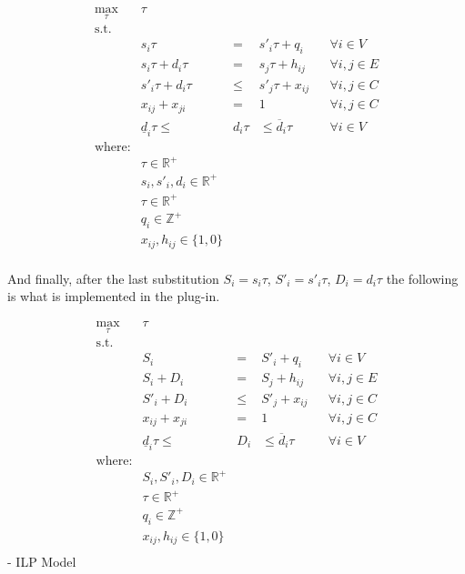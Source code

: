 \begin{equation}
\begin{matrix}
\displaystyle \max_\tau & \tau  \\
\textrm{s.t.} \\
& s_i \tau & = & s'_i \tau + q_i & & \forall i \in V \\
& s_i \tau + d_i \tau & = & s_j \tau + h_{ij} & & \forall i, j \in E \\
& s'_i \tau + d_i \tau & \leq & s'_j \tau + x_{ij} & & \forall i, j \in C \\
& x_{ij} + x_{ji} & = & 1 & & \forall i, j \in C \\
& \underline{d}_i \tau \leq &  d_i \tau & \leq \overline{d}_i \tau & & \forall i \in V \\

\textrm{where:} \\
& \tau \in \mathbb{R}^+\\
& s_i, s'_i, d_i \in \mathbb{R}^+\\
& \tau \in \mathbb{R}^+ \\
& q_i \in \mathbb{Z}^+\\
& x_{ij}, h_{ij} \in \{1, 0\} \\

\end{matrix}
\end{equation}

And finally, after the last substitution $ S_i = s_i \tau $, $ S'_i = s'_i \tau $, $ D_i = d_i \tau $ the following is what is implemented in the plug-in.

\begin{equation}
\begin{matrix}
\displaystyle \max_\tau & \tau  \\
\textrm{s.t.} \\
& S_i & = & S'_i + q_i & & \forall i \in V \\
& S_i + D_i & = & S_j + h_{ij} & & \forall i, j \in E \\
& S'_i + D_i & \leq & S'_j + x_{ij} & & \forall i, j \in C \\
& x_{ij} + x_{ji} & = & 1 & & \forall i, j \in C \\
& \underline{d}_i \tau \leq &  D_i & \leq \overline{d}_i \tau & & \forall i \in V \\

\textrm{where:} \\
& S_i, S'_i, D_i \in \mathbb{R}^+\\
& \tau \in \mathbb{R}^+ \\
& q_i \in \mathbb{Z}^+\\
& x_{ij}, h_{ij} \in \{1, 0\} \\

\end{matrix}
\end{equation}
- ILP Model